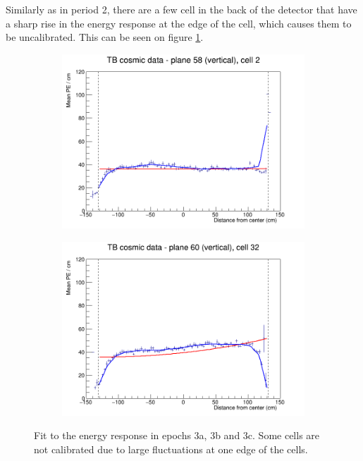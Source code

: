 \documentclass[12pt,a4paper]{article}
\begin{document}
Similarly as in period 2, there are a few cell in the back of the detector that have a sharp rise in the energy response at the edge of the cell, which causes them to be uncalibrated. This can be seen on figure \ref{figAttenfitResultsEpoch3abc_CellEdges}.

\begin{figure}[h]
  \begin{subfigure}{0.5\textwidth}
    \includegraphics[width=\linewidth]{RelativeCalibrationResults/ep3abc_058_002.png}
  \end{subfigure}
  \begin{subfigure}{0.5\textwidth}
    \includegraphics[width=\linewidth]{RelativeCalibrationResults/ep3abc_060_032.png}
  \end{subfigure}
  \caption{Fit to the energy response in epochs 3a, 3b and 3c. Some cells are not calibrated due to large fluctuations at one edge of the cells.}
  \label{figAttenfitResultsEpoch3abc_CellEdges}
\end{figure}
\end{document}
